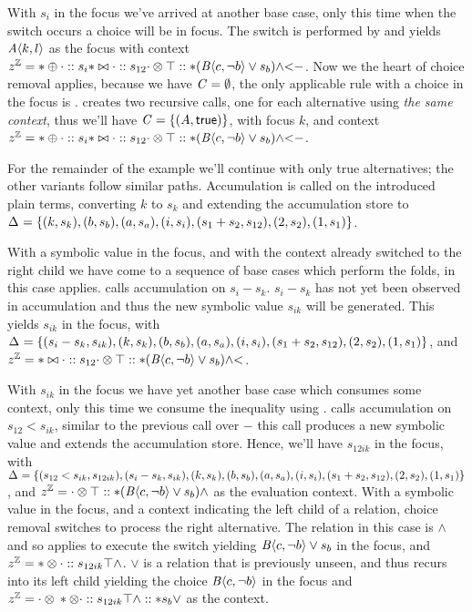 With $s_{i}$ in the focus we've arrived at another base case, only this time when
the switch occurs a choice will be in focus. The switch is performed by
\crArithL{} and yields $\chc[A]{k, l}$ as the focus with context $\zipper =
\inArithR*{s_{i}}{\inInEqR*{s_{12}}{\inBoolL*{\inRoot{}}{(\chc[B]{c,\neg b}
      \vee{} s_{b})}{\wedge}}{<}}{-}$. Now we the heart of choice removal
applies, because we have $\configuration{} = \emptyset$, the only applicable
rule with a choice in the focus is \crChc. \crChc{} creates two recursive calls,
one for each alternative using \emph{the same context}, thus we'll have
$\configuration= \set{(A,\true)}$, with focus $k$, and context $\zipper =
\inArithR*{s_{i}}{\inInEqR*{s_{12}}{\inBoolL*{\inRoot{}}{(\chc[B]{c,\neg b}
      \vee{} s_{b})}{\wedge}}{<}}{-}$.

For the remainder of the example we'll continue with only true alternatives; the
other variants follow similar paths. Accumulation is called on the introduced plain terms, converting $k$ to
$s_{k}$ and extending the accumulation store to
\newline$\aStore{}=\set{(k,s_{k}),(b, s_{b}),(a,s_{a}),(i, s_{i}),(s_{1} +
  s_{2}, s_{12}), (2,s_{2}), (1,s_{1})}$.

With a symbolic value in the focus, and with the context already switched to the
right child we have come to a sequence of base cases which perform the folds, in
this case \crArithR{} applies. \crArithR{} calls accumulation on $s_{i} -
s_{k}$. $s_{i} - s_{k}$ has not yet been observed in accumulation and thus the
new symbolic value $s_{ik}$ will be generated. This yields $s_{ik}$ in the
focus, with $\aStore{}=\set{(s_{i} - s_{k}, s_{ik}), (k,s_{k}),(b,
  s_{b}),(a,s_{a}),(i, s_{i}),(s_{1} + s_{2}, s_{12}), (2,s_{2}), (1,s_{1})}$,
and $\zipper = \inInEqR*{s_{12}}{\inBoolL*{\inRoot{}}{(\chc[B]{c,\neg b} \vee{}
    s_{b})}{\wedge}}{<}$.

With $s_{ik}$ in the focus we have yet another base case which consumes some
context, only this time we consume the inequality using \crInEqR{}. \crInEqR{}
calls accumulation on $s_{12} < s_{ik}$, similar to the previous call over $-$
this call produces a new symbolic value and extends the accumulation store.
Hence, we'll have $s_{12ik}$ in the focus, with $\aStore{}=\set{(s_{12} <
  s_{ik}, s_{12ik}),(s_{i} - s_{k}, s_{ik}), (k,s_{k}),(b, s_{b}),(a,s_{a}),(i,
  s_{i}),(s_{1} + s_{2}, s_{12}), (2,s_{2}), (1,s_{1})}$, and $\zipper =
\inBoolL*{\inRoot{}}{(\chc[B]{c,\neg b} \vee{} s_{b})}{\wedge}$ as the
evaluation context. With a symbolic value in the focus, and a context indicating
the left child of a relation, choice removal switches to process the right
alternative. The relation in this case is $\wedge$ and so \crBoolL{} applies to
execute the switch yielding $\chc[B]{c,\neg b} \vee{} s_{b}$ in the focus, and
$\zipper = \inBoolR*{s_{12ik}}{\inRoot{}}{\wedge}$. $\vee$ is a relation that is
previously unseen, and thus \crBool{} recurs into its left child yielding the
choice $\chc[B]{c, \neg b}$ in the focus and \newline$\zipper =
\inBoolL*{\inBoolR*{s_{12ik}}{\inRoot{}}{\wedge}}{s_{b}}{\vee}$ as the context.

